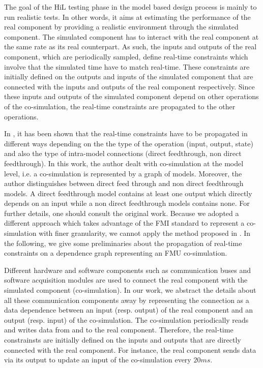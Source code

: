 The goal of the HiL testing phase in the model based design process is mainly to run realistic tests. In other words, it aims at estimating the performance of the real component by providing a realistic environment through the simulated component. The simulated component has to interact with the real component at the same rate as its real counterpart. As such, the inputs and outputs of the real component, which are periodically sampled, define real-time constraints which involve that the simulated time have to match real-time. These constraints are initially defined on the outputs and inputs of the simulated component that are connected with the inputs and outputs of the real component respectively. Since these inputs and outputs of the simulated component depend on other operations of the co-simulation, the real-time constraints are propagated to the other operations.

In \cite{faure:2011}, it has been shown that the real-time constraints have to be propagated in different ways depending on the the type of the operation (input, output, state) and also the type of intra-model connections (direct feedthrough, non direct feedthrough). In this work, the author dealt with co-simulation at the model level, i.e. a co-simulation is represented by a graph of models. Moreover, the author distinguishes between direct feed through and non direct feedthrough models. A direct feedthrough model contains at least one output which directly depends on an input while a non direct feedthrough models contains none. For further details, one should consult the original work. Because we adopted a different approach which takes advantage of the FMI standard to represent a co-simulation with finer granularity, we cannot apply the method proposed in \cite{faure:2011}. In the following, we give some preliminaries about the propagation of real-time constraints on a dependence graph representing an FMU co-simulation. 

Different hardware and software components such as communication buses and software acquisition modules are used to connect the real component with the simulated component (co-simulation). In our work, we abstract the details about all these communication components away by representing the connection as a data dependence between an input (resp. output) of the real component and an output (resp. input) of the co-simulation. The co-simulation periodically reads and writes data from and to the real component. Therefore, the real-time constrainsts are initially defined on the inputs and outputs that are directly connected with the real component. For instance, the real component sends data via its output to update an input of the co-simulation every $20ms$.

